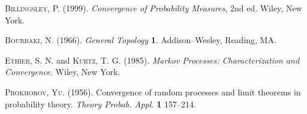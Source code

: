 \documentclass[ss]{imsart}
\numberwithin{equation}{section}
\theoremstyle{plain}
\begin{document}
\begin{thebibliography}{9}

\textsc{Billingsley, P.} (1999). \textit{Convergence of
Probability Measures}, 2nd ed.
Wiley, New York.

\textsc{Bourbaki, N.}  (1966). \textit{General Topology}  \textbf{1}.
Addison--Wesley, Reading, MA.

\textsc{Ethier, S. N.} and \textsc{Kurtz, T. G.} (1985).
\textit{Markov Processes: Characterization and Convergence}.
Wiley, New York.

\textsc{Prokhorov, Yu.} (1956).
Convergence of random processes and limit theorems in probability
theory. \textit{Theory  Probab.  Appl.}
\textbf{1} 157--214.

\end{thebibliography}
\end{document}
